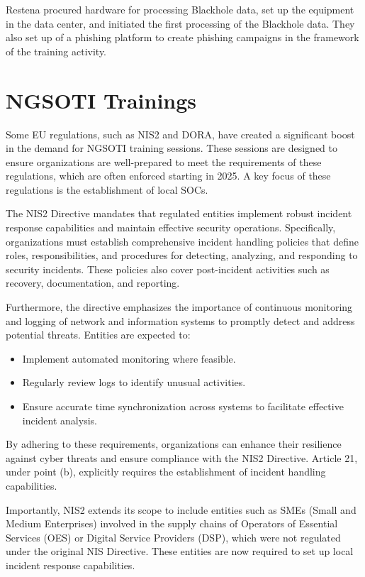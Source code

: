 Restena procured hardware for processing Blackhole data, set up the equipment in the data center, and initiated the first processing of the Blackhole data.
They also set up of a phishing platform to create phishing campaigns in the framework of the training activity.

\chapter{NGSOTI Trainings}
Some EU regulations, such as NIS2 and DORA, have created a significant boost in the demand for NGSOTI training sessions. These sessions are designed to ensure organizations are well-prepared to meet the requirements of these regulations, which are often enforced starting in 2025. A key focus of these regulations is the establishment of local SOCs.

The NIS2 Directive mandates that regulated entities implement robust incident response capabilities and maintain effective security operations. Specifically, organizations must establish comprehensive incident handling policies that define roles, responsibilities, and procedures for detecting, analyzing, and responding to security incidents. These policies also cover post-incident activities such as recovery, documentation, and reporting.

Furthermore, the directive emphasizes the importance of continuous monitoring and logging of network and information systems to promptly detect and address potential threats. Entities are expected to:

\begin{itemize}
	\item Implement automated monitoring where feasible.
	\item Regularly review logs to identify unusual activities.
	\item Ensure accurate time synchronization across systems to facilitate effective incident analysis.
\end{itemize}

By adhering to these requirements, organizations can enhance their resilience against cyber threats and ensure compliance with the NIS2 Directive. Article 21, under point (b), explicitly requires the establishment of incident handling capabilities.

Importantly, NIS2 extends its scope to include entities such as SMEs (Small and Medium Enterprises) involved in the supply chains of Operators of Essential Services (OES) or Digital Service Providers (DSP), which were not regulated under the original NIS Directive. These entities are now required to set up local incident response capabilities.


